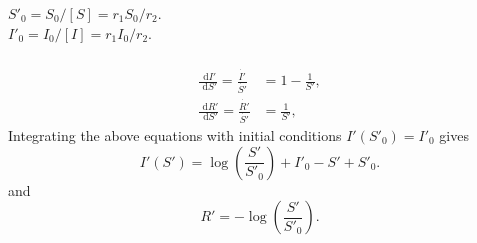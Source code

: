 \documentclass[]{article}
\newcommand{\bb}{\begin{equation}}
\newcommand{\ee}{\end{equation}}
\newcommand{\rd}{\text{ d}}
\renewcommand{\l}{\left(}
\renewcommand{\r}{\right)}
\begin{document}
\begin{Answ}
\subsubsection{}
$S'_0=S_0/[S]=r_1S_0/r_2.$\\
$I'_0=I_0/[I]=r_1I_0/r_2.$

\subsubsection{}
\begin{align}
\frac{\rd I'}{\rd S'}=\frac{\dot{I'}}{\dot{S'}}&=1-\frac{1}{S'},\nonumber\\
\frac{\rd R'}{\rd S'}=\frac{\dot{R'}}{\dot{S'}}&=\frac{1}{S'},\nonumber
\end{align}
Integrating the above equations with initial conditions $I'(S'_0)=I'_0$ gives
\bb
I'(S') = \log\l \frac{S'}{S'_0}\r+I'_0-S'+S'_0.
\ee
and
\bb
R'=-\log\l \frac{S'}{S'_0}\r.
\ee
\end{Answ}
\end{document}
